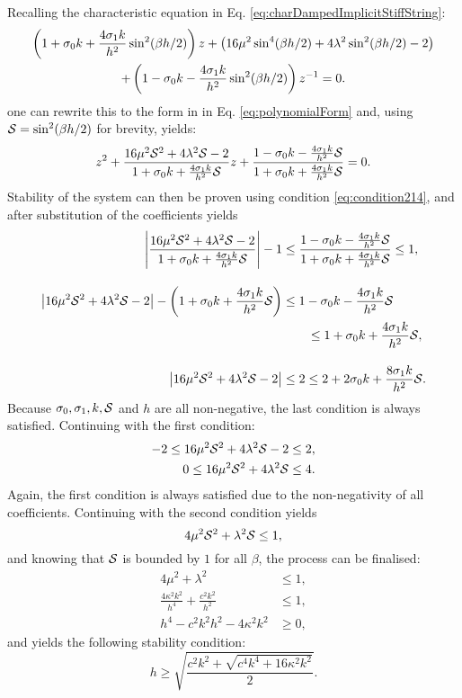 Recalling the characteristic equation in Eq. \eqref{eq:charDampedImplicitStiffString}:
\begin{gather*}
    \left(1+\sz k + \frac{4\so k}{h^2}\sin^2(\beta h/2)\right)z + \left(16\mu^2\sin^4(\beta h/2)+4\lambda^2\sin^2(\beta h/2) - 2\right)\nonumber\\
    + \left(1-\sz k - \frac{4\so k}{h^2}\sin^2(\beta h/2)\right)z^{-1} = 0.
\end{gather*}
one can rewrite this to the form in in Eq. \eqref{eq:polynomialForm} and, using $\S = \sin^2(\beta h / 2)$ for brevity, yields:
\begin{equation*}
z^2 + \frac{16\mu^2\S^2+4\lambda^2\S - 2}{1+\sz k + \frac{4\so k}{h^2}\S}z+\frac{1-\sz k - \frac{4\so k}{h^2}\S}{1+\sz k + \frac{4\so k}{h^2}\S} = 0.
\end{equation*}
Stability of the system can then be proven using condition \eqref{eq:condition214}, and after substitution of the coefficients yields
\begin{align*}
\left|\frac{16\mu^2\S^2+4\lambda^2\S - 2}{1+\sz k + \frac{4\so k}{h^2}\S} \right|-1 &\leq \frac{1-\sz k - \frac{4\so k}{h^2}\S}{1+\sz k + \frac{4\so k}{h^2}\S}\leq 1,\\[1em]
\left|16\mu^2\S^2+4\lambda^2\S - 2 \right| - \left(1+\sz k + \frac{4\so k}{h^2}\S\right) &\leq 1-\sz k - \frac{4\so k}{h^2}\S\\
&\qquad\leq 1+\sz k + \frac{4\so k}{h^2}\S,\\[1em]
\left|16\mu^2\S^2+4\lambda^2\S - 2 \right|&\leq 2 \leq 2+2\sz k + \frac{8\so k}{h^2}\S.
\end{align*} 
Because $\sz, \so, k, \S$ and $h$ are all non-negative, the last condition is always satisfied. Continuing with the first condition:
\begin{align*}
    -2\leq 16\mu^2\S^2+4\lambda^2\S - 2 &\leq 2,\\
    0\leq 16\mu^2\S^2+4\lambda^2\S &\leq 4.
\end{align*}
Again, the first condition is always satisfied due to the non-negativity of all coefficients. Continuing with the second condition yields
\begin{equation*}
    4\mu^2\S^2+\lambda^2\S \leq 1,
\end{equation*} 
and knowing that $\S$ is bounded by $1$ for all $\beta$, the process can be finalised:
\begin{align*}
    4\mu^2+\lambda^2 &\leq 1,\\
    \frac{4\kappa^2k^2}{h^4}+\frac{c^2k^2}{h^2} &\leq 1,\\
    h^4 - c^2k^2h^2 - 4\kappa^2k^2 &\geq 0,
\end{align*}
and yields the following stability condition:
\begin{equation*}
    h \geq \sqrt{\frac{c^2k^2 + \sqrt{c^4k^4 + 16\kappa^2k^2}}{2}}.
\end{equation*}
